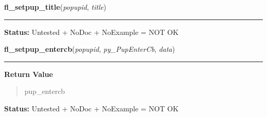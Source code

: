     \label{xformslib:library:fl_setpup_title}

    \vspace{0.5ex}

\hspace{.8\funcindent}\begin{boxedminipage}{\funcwidth}

    \raggedright \textbf{fl\_setpup\_title}(\textit{popupid}, \textit{title})

    \vspace{-1.5ex}

    \rule{\textwidth}{0.5\fboxrule}
\setlength{\parskip}{2ex}
\setlength{\parskip}{1ex}
\textbf{Status:} Untested + NoDoc + NoExample = NOT OK



    \end{boxedminipage}

    \label{xformslib:library:fl_setpup_entercb}

    \vspace{0.5ex}

\hspace{.8\funcindent}\begin{boxedminipage}{\funcwidth}

    \raggedright \textbf{fl\_setpup\_entercb}(\textit{popupid}, \textit{py\_PupEnterCb}, \textit{data})

    \vspace{-1.5ex}

    \rule{\textwidth}{0.5\fboxrule}
\setlength{\parskip}{2ex}
\setlength{\parskip}{1ex}
      \textbf{Return Value}
    \vspace{-1ex}

      \begin{quote}
      pup\_entercb

      \end{quote}

\textbf{Status:} Untested + NoDoc + NoExample = NOT OK



    \end{boxedminipage}

    \label{xformslib:library:fl_setpup_leavecb}

